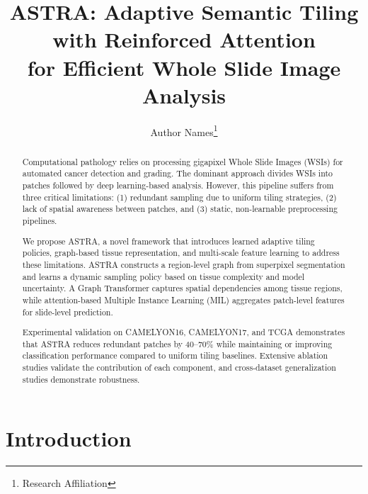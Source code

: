 \documentclass[runningheads]{llncs}
\begin{document}
\title{ASTRA: Adaptive Semantic Tiling with Reinforced Attention \\
for Efficient Whole Slide Image Analysis}

\author{Author Names\thanks{Research Affiliation}}


\maketitle

\begin{abstract}

Computational pathology relies on processing gigapixel Whole Slide Images (WSIs) for automated cancer detection and grading. The dominant approach divides WSIs into patches followed by deep learning-based analysis. However, this pipeline suffers from three critical limitations: (1) redundant sampling due to uniform tiling strategies, (2) lack of spatial awareness between patches, and (3) static, non-learnable preprocessing pipelines.

We propose ASTRA, a novel framework that introduces learned adaptive tiling policies, graph-based tissue representation, and multi-scale feature learning to address these limitations. ASTRA constructs a region-level graph from superpixel segmentation and learns a dynamic sampling policy based on tissue complexity and model uncertainty. A Graph Transformer captures spatial dependencies among tissue regions, while attention-based Multiple Instance Learning (MIL) aggregates patch-level features for slide-level prediction.

Experimental validation on CAMELYON16, CAMELYON17, and TCGA demonstrates that ASTRA reduces redundant patches by 40--70\% while maintaining or improving classification performance compared to uniform tiling baselines. Extensive ablation studies validate the contribution of each component, and cross-dataset generalization studies demonstrate robustness.


\end{abstract}

\section{Introduction}
\end{document}
